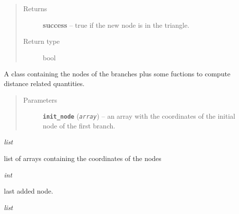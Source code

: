 \documentclass[letterpaper,10pt,english]{sphinxmanual}
\begin{document}
\begin{fulllineitems}
\begin{fulllineitems}
\begin{quote}
\begin{description}
\begin{itemize}
\end{itemize}

\item[{Returns}] \leavevmode
\textbf{success} --
true if the new node is in the triangle.

\item[{Return type}] \leavevmode
bool

\end{description}\end{quote}

\end{fulllineitems}


\end{fulllineitems}


\begin{fulllineitems}
\label{Branch3D:Branch3D.Nodes}
A class containing the nodes of the branches plus some fuctions to compute distance related quantities.
\begin{quote}\begin{description}
\item[{Parameters}] \leavevmode
\textbf{\texttt{init\_node}} (\emph{\texttt{array}}) -- an array with the coordinates of the initial node of the first branch.

\end{description}\end{quote}

\begin{fulllineitems}
\label{Branch3D:Branch3D.Nodes.nodes}
\emph{list}

list of arrays containing the coordinates of the nodes

\end{fulllineitems}


\begin{fulllineitems}
\label{Branch3D:Branch3D.Nodes.last_node}
\emph{int}

last added node.

\end{fulllineitems}


\begin{fulllineitems}
\label{Branch3D:Branch3D.Nodes.end_nodes}
\emph{list}


\end{fulllineitems}
\end{fulllineitems}
\end{document}
